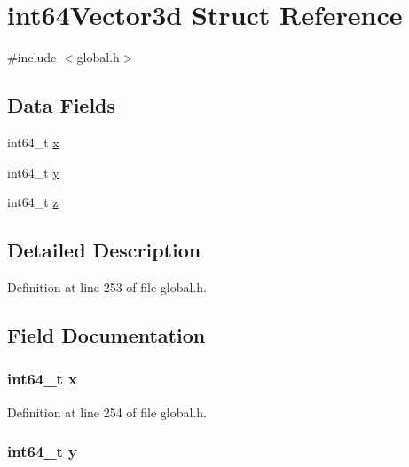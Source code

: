 \hypertarget{structint64Vector3d}{\section{int64\-Vector3d Struct Reference}
\label{structint64Vector3d}
}


{\ttfamily \#include $<$global.\-h$>$}

\subsection*{Data Fields}
\begin{DoxyCompactItemize}
\item 
int64\-\_\-t \hyperlink{structint64Vector3d_a040359f45343ce6667f5c66fda5f50e3}{x}
\item 
int64\-\_\-t \hyperlink{structint64Vector3d_a0cbcba26311a97b8e0763317e105a918}{y}
\item 
int64\-\_\-t \hyperlink{structint64Vector3d_a44624880ae3bb63041297b70cb33408b}{z}
\end{DoxyCompactItemize}


\subsection{Detailed Description}


Definition at line 253 of file global.\-h.



\subsection{Field Documentation}
\hypertarget{structint64Vector3d_a040359f45343ce6667f5c66fda5f50e3}{
\subsubsection[{x}]{\setlength{\rightskip}{0pt plus 5cm}int64\-\_\-t x}}\label{structint64Vector3d_a040359f45343ce6667f5c66fda5f50e3}


Definition at line 254 of file global.\-h.

\hypertarget{structint64Vector3d_a0cbcba26311a97b8e0763317e105a918}{
\subsubsection[{y}]{\setlength{\rightskip}{0pt plus 5cm}int64\-\_\-t y}}\label{structint64Vector3d_a0cbcba26311a97b8e0763317e105a918}



